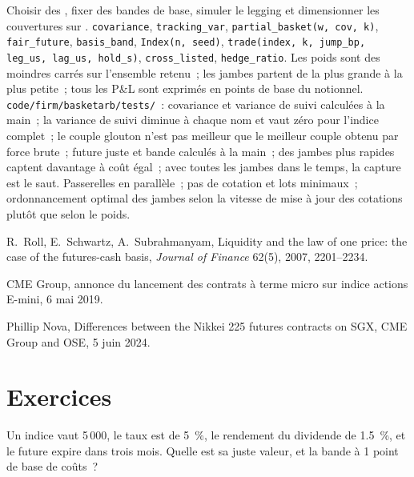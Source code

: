 \begin{build}
 Choisir des , fixer des bandes de base, simuler le legging et dimensionner les couvertures sur .
 \texttt{covariance}, \texttt{tracking\_var}, \texttt{partial\_basket(w, cov, k)}, \texttt{fair\_future}, \texttt{basis\_band},
\texttt{Index(n, seed)}, \texttt{trade(index, k, jump\_bp, leg\_us, lag\_us, hold\_s)}, \texttt{cross\_listed}, \texttt{hedge\_ratio}.
 Les poids sont des moindres carrés sur l'ensemble retenu~; les jambes partent de la plus grande à la plus petite~; tous les P\&L sont exprimés en points de base du notionnel.
 \texttt{code/firm/basketarb/tests/}~: covariance et variance de suivi calculées à la main~; la variance de suivi diminue à chaque nom et
vaut zéro pour l'indice complet~; le couple glouton n'est pas meilleur que le meilleur couple obtenu par force brute~; future juste et bande calculés à la main~; des jambes plus rapides captent davantage à
coût égal~; avec toutes les jambes dans le temps, la capture est le saut.
 Passerelles en parallèle~; pas de cotation et lots minimaux~; ordonnancement optimal des jambes selon la vitesse de mise à jour des cotations plutôt que selon le poids.
\end{build}

\begin{omsources}
\item R.~Roll, E.~Schwartz, A.~Subrahmanyam, Liquidity and the law of one price: the case of the futures-cash basis, \emph{Journal of Finance}
62(5), 2007, 2201--2234.
\item CME Group, annonce du lancement des contrats à terme micro sur indice actions E-mini, 6 mai 2019.
\item Phillip Nova, Differences between the Nikkei 225 futures contracts on SGX, CME Group and OSE, 5 juin 2024.
\end{omsources}

\section{Exercices}

\begin{exercise}[$\star$]\label{exo:hf:index-and-basket-arbitrage:1}
Un indice vaut 5\,000, le taux est de 5~\%, le rendement du dividende de 1.5~\%, et le future expire dans trois mois. Quelle est sa juste valeur, et la bande à 1
point de base de coûts~?
\end{exercise}

